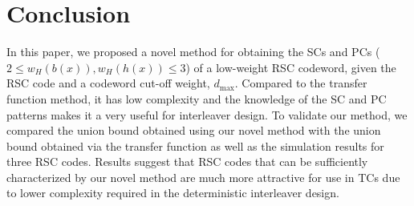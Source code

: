 \section{Conclusion}
\label{sec6}
In this paper, we proposed a novel method for  obtaining the SCs and PCs ($2 \leq w_H(b(x)),w_H(h(x)) \leq 3$) of a low-weight RSC codeword, given the RSC code and a codeword cut-off weight, $d_{\text{max}}$.
Compared to the transfer function method, it has low complexity and the knowledge of the SC and PC patterns makes it a very useful for interleaver design. To validate our method, we compared the union bound obtained using our novel method with the union bound obtained via the transfer function as well as the simulation results for three RSC codes. Results suggest that RSC codes that can be sufficiently characterized by our novel method are much more attractive for use in TCs due to lower complexity required in the deterministic interleaver design.
